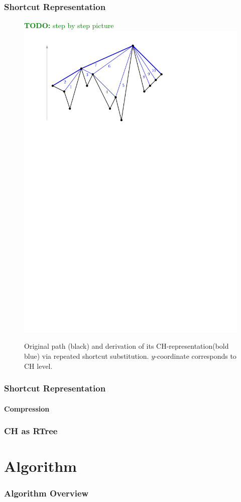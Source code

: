 \documentclass{beamer}
\newcommand{\TODO}[1]{\noindent\textcolor{green}{\textbf{TODO:} #1}}
\newcommand{\chrep}{CH-representation\xspace}
\begin{document}
\begin{frame}
	\frametitle{Shortcut Representation}
	\begin{figure}
		\TODO{step by step picture}
		\includegraphics[width=.76\columnwidth]{images/toch}
		\caption{Original path (black) and derivation of its \chrep (bold blue) via repeated shortcut substitution. $y$-coordinate corresponds to CH level.}
	\end{figure}
\end{frame}

\begin{frame}
	\frametitle{Shortcut Representation}
	\framesubtitle{Compression}
\end{frame}

\begin{frame}
	\frametitle{CH as RTree}
\end{frame}

\section{Algorithm}

\begin{frame}
	\frametitle{Algorithm Overview}
\end{frame}
\end{document}
